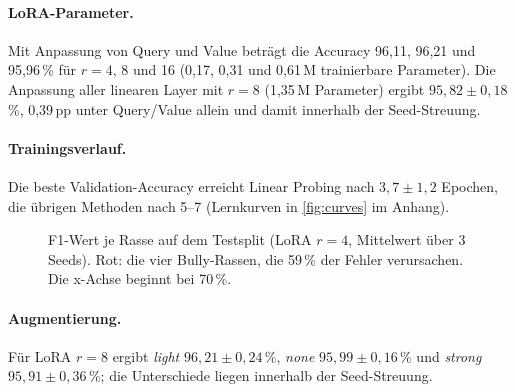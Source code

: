 \paragraph{LoRA-Parameter.}
Mit Anpassung von Query und Value beträgt die Accuracy 96,11, 96,21 und 95,96\,\% für $r=4$, 8 und 16
(0,17, 0,31 und 0,61\,M trainierbare Parameter). Die Anpassung aller linearen Layer mit $r=8$
(1,35\,M Parameter) ergibt $95{,}82\pm0{,}18$\,\%, 0,39\,pp unter Query/Value allein und damit innerhalb
der Seed-Streuung.

\paragraph{Trainingsverlauf.}
Die beste Validation-Accuracy erreicht Linear Probing nach $3{,}7\pm1{,}2$ Epochen, die übrigen Methoden
nach 5--7 (Lernkurven in \cref{fig:curves} im Anhang).

\begin{figure}[t]
  \centering
  \caption{F1-Wert je Rasse auf dem Testsplit (LoRA $r=4$, Mittelwert über 3 Seeds). Rot: die vier
  Bully-Rassen, die 59\,\% der Fehler verursachen. Die x-Achse beginnt bei 70\,\%.}
  \label{fig:perbreed}
\end{figure}

\paragraph{Augmentierung.}
Für LoRA $r=8$ ergibt \emph{light} $96{,}21\pm0{,}24$\,\%, \emph{none} $95{,}99\pm0{,}16$\,\% und
\emph{strong} $95{,}91\pm0{,}36$\,\%; die Unterschiede liegen innerhalb der Seed-Streuung.
